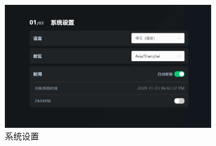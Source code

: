 \begin{figure}[ht]
    \centering
    \includegraphics[width=0.8\textwidth]{screen/2-5.png}
    \caption{系统设置}
    \label{fig:系统设置}
\end{figure}

